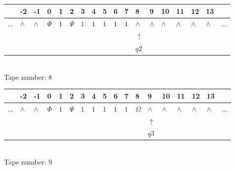 \documentclass[11pt]{article}
\begin{document}
\begin{table}[H]
\centering
\begin{tabular}{llllllllllllllllll}
 & -2 & -1 & 0 & 1 & 2 & 3 & 4 & 5 & 6 & 7 & 8 & 9 & 10 & 11 & 12 & 13 & \\
\hline
$...$ & \multicolumn{1}{|l|}{$\wedge$} & \multicolumn{1}{|l|}{$\wedge$} & \multicolumn{1}{|l|}{$\Phi$} & \multicolumn{1}{|l|}{$1$} & \multicolumn{1}{|l|}{$\Psi$} & \multicolumn{1}{|l|}{$1$} & \multicolumn{1}{|l|}{$1$} & \multicolumn{1}{|l|}{$1$} & \multicolumn{1}{|l|}{$1$} & \multicolumn{1}{|l|}{$1$} & \multicolumn{1}{|l|}{$\wedge$} & \multicolumn{1}{|l|}{$\wedge$} & \multicolumn{1}{|l|}{$\wedge$} & \multicolumn{1}{|l|}{$\wedge$} & \multicolumn{1}{|l|}{$\wedge$} & \multicolumn{1}{|l|}{$\wedge$} & $...$\\
\hline
&  &  &  &  &  &  &  &  &  &  & $\uparrow$ &  &  &  &  &  &  \\
&  &  &  &  &  &  &  &  &  &  & $ q2 $ &  &  &  &  &  &  \\
\end{tabular}
\\
Tape number: 8
\noindent\makebox[\linewidth]{\hdashrule{\textwidth}{1pt}{1pt}}\end{table}

\begin{table}[H]
\centering
\begin{tabular}{llllllllllllllllll}
 & -2 & -1 & 0 & 1 & 2 & 3 & 4 & 5 & 6 & 7 & 8 & 9 & 10 & 11 & 12 & 13 & \\
\hline
$...$ & \multicolumn{1}{|l|}{$\wedge$} & \multicolumn{1}{|l|}{$\wedge$} & \multicolumn{1}{|l|}{$\Phi$} & \multicolumn{1}{|l|}{$1$} & \multicolumn{1}{|l|}{$\Psi$} & \multicolumn{1}{|l|}{$1$} & \multicolumn{1}{|l|}{$1$} & \multicolumn{1}{|l|}{$1$} & \multicolumn{1}{|l|}{$1$} & \multicolumn{1}{|l|}{$1$} & \multicolumn{1}{|l|}{$\Omega$} & \multicolumn{1}{|l|}{$\wedge$} & \multicolumn{1}{|l|}{$\wedge$} & \multicolumn{1}{|l|}{$\wedge$} & \multicolumn{1}{|l|}{$\wedge$} & \multicolumn{1}{|l|}{$\wedge$} & $...$\\
\hline
&  &  &  &  &  &  &  &  &  &  &  & $\uparrow$ &  &  &  &  &  \\
&  &  &  &  &  &  &  &  &  &  &  & $ q3 $ &  &  &  &  &  \\
\end{tabular}
\\
Tape number: 9
\noindent\makebox[\linewidth]{\hdashrule{\textwidth}{1pt}{1pt}}\end{table}
\end{document}
